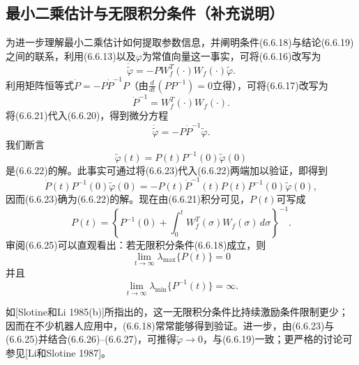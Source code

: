 \documentclass[12pt,a4paper]{ctexart}
\begin{document}
\subsection*{最小二乘估计与无限积分条件（补充说明）}

为进一步理解最小二乘估计如何提取参数信息，并阐明条件(6.6.18)与结论(6.6.19)之间的联系，利用(6.6.13)以及$\varphi$为常值向量这一事实，可将(6.6.16)改写为
\begin{equation}\label{eq:6.6.20}
\dot{\tilde{\varphi}} = -P W_f^T(\cdot) W_f(\cdot) \tilde{\varphi}.
\end{equation}
利用矩阵恒等式$\dot{P} = -P \dot{P}^{-1} P$（由$\frac{d}{dt}(P P^{-1})=0$立得），可将(6.6.17)改写为
\begin{equation}\label{eq:6.6.21}
\dot{P}^{-1} = W_f^T(\cdot) W_f(\cdot).
\end{equation}
将(6.6.21)代入(6.6.20)，得到微分方程
\begin{equation}\label{eq:6.6.22}
\dot{\tilde{\varphi}} = -P \dot{P}^{-1} \tilde{\varphi}.
\end{equation}
我们断言
\begin{equation}\label{eq:6.6.23}
\tilde{\varphi}(t) = P(t) P^{-1}(0) \tilde{\varphi}(0)
\end{equation}
是(6.6.22)的解。此事实可通过将(6.6.23)代入(6.6.22)两端加以验证，即得到
\begin{equation}\label{eq:6.6.24}
\dot{P}(t) P^{-1}(0) \tilde{\varphi}(0) = -P(t) \dot{P}^{-1}(t) P(t) P^{-1}(0) \tilde{\varphi}(0),
\end{equation}
因而(6.6.23)确为(6.6.22)的解。现在由(6.6.21)积分可见，$P(t)$可写成
\begin{equation}\label{eq:6.6.25}
P(t) = \left\{ P^{-1}(0) + \int_{0}^{t} W_f^T(\sigma) W_f(\sigma)\, d\sigma \right\}^{-1}.
\end{equation}
审阅(6.6.25)可以直观看出：若无限积分条件(6.6.18)成立，则
\begin{equation}\label{eq:6.6.26}
\lim_{t \to \infty} \lambda_{\max}\{P(t)\} = 0
\end{equation}
并且
\begin{equation}\label{eq:6.6.27}
\lim_{t \to \infty} \lambda_{\min}\{P^{-1}(t)\} = \infty.
\end{equation}

如[Slotine和Li 1985(b)]所指出的，这一无限积分条件比持续激励条件限制更少；因而在不少机器人应用中，(6.6.18)常常能够得到验证。进一步，由(6.6.23)与(6.6.25)并结合(6.6.26)--(6.6.27)，可推得$\tilde{\varphi}\to 0$，与(6.6.19)一致；更严格的讨论可参见[Li和Slotine 1987]。
\end{document}
